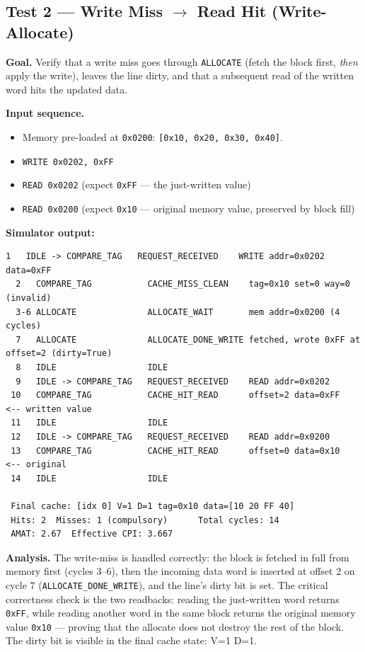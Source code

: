 \documentclass[11pt,a4paper]{article}
\begin{document}
\subsection{Test 2 — Write Miss $\to$ Read Hit (Write-Allocate)}

\textbf{Goal.} Verify that a write miss goes through \texttt{ALLOCATE} (fetch
the block first, \emph{then} apply the write), leaves the line dirty, and
that a subsequent read of the written word hits the updated data.

\textbf{Input sequence.}
\begin{itemize}[leftmargin=1.4em,itemsep=0.05em]
    \item Memory pre-loaded at \texttt{0x0200}: \texttt{[0x10, 0x20, 0x30, 0x40]}.
    \item \texttt{WRITE 0x0202, 0xFF}
    \item \texttt{READ 0x0202} (expect \texttt{0xFF} — the just-written value)
    \item \texttt{READ 0x0200} (expect \texttt{0x10} — original memory value, preserved by block fill)
\end{itemize}

\textbf{Simulator output:}
\begin{lstlisting}[style=trace]
  1   IDLE -> COMPARE_TAG   REQUEST_RECEIVED    WRITE addr=0x0202 data=0xFF
  2   COMPARE_TAG           CACHE_MISS_CLEAN    tag=0x10 set=0 way=0 (invalid)
  3-6 ALLOCATE              ALLOCATE_WAIT       mem addr=0x0200 (4 cycles)
  7   ALLOCATE              ALLOCATE_DONE_WRITE fetched, wrote 0xFF at offset=2 (dirty=True)
  8   IDLE                  IDLE
  9   IDLE -> COMPARE_TAG   REQUEST_RECEIVED    READ addr=0x0202
 10   COMPARE_TAG           CACHE_HIT_READ      offset=2 data=0xFF   <-- written value
 11   IDLE                  IDLE
 12   IDLE -> COMPARE_TAG   REQUEST_RECEIVED    READ addr=0x0200
 13   COMPARE_TAG           CACHE_HIT_READ      offset=0 data=0x10   <-- original
 14   IDLE                  IDLE

 Final cache: [idx 0] V=1 D=1 tag=0x10 data=[10 20 FF 40]
 Hits: 2  Misses: 1 (compulsory)      Total cycles: 14
 AMAT: 2.67  Effective CPI: 3.667
\end{lstlisting}

\textbf{Analysis.} The write-miss is handled correctly: the block is fetched
in full from memory first (cycles 3–6), then the incoming data word is
inserted at offset 2 on cycle 7 (\texttt{ALLOCATE\_DONE\_WRITE}), and the
line's dirty bit is set. The critical correctness check is the two readbacks:
reading the just-written word returns \texttt{0xFF}, while reading another
word in the same block returns the original memory value \texttt{0x10} —
proving that the allocate does not destroy the rest of the block. The dirty
bit is visible in the final cache state: V=1 D=1.
\end{document}
